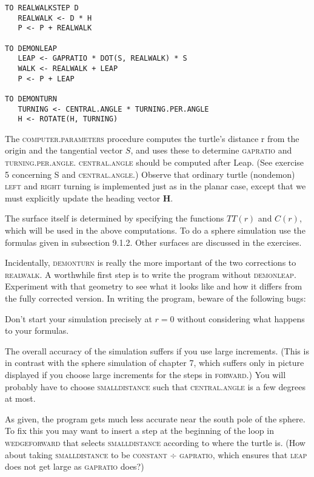 \documentclass{book}
\begin{document}
\begin{verbatim}
TO REALWALKSTEP D
   REALWALK <- D * H
   P <- P + REALWALK

TO DEMONLEAP
   LEAP <- GAPRATIO * DOT(S, REALWALK) * S
   WALK <- REALWALK + LEAP
   P <- P + LEAP

TO DEMONTURN
   TURNING <- CENTRAL.ANGLE * TURNING.PER.ANGLE
   H <- ROTATE(H, TURNING)
\end{verbatim}
The \textsc{computer}\textsc{.parameters} procedure computes the turtle's distance
r from the origin and the tangential vector $S$, and uses these to determine \textsc{gapratio} and \textsc{turning}\textsc{.per}\textsc{.angle}. \textsc{central}\textsc{.angle} should be
computed after Leap. (See exercise 5 concerning S and \textsc{central}\textsc{.angle}.)
Observe that ordinary turtle (nondemon) \textsc{left} and \textsc{right} turning is
implemented just as in the planar case, except that we must explicitly
update the heading vector \textbf{H}.

The surface itself is determined by specifying the functions $TT(r)$ and
$C(r)$, which will be used in the above computations. To do a sphere
simulation use the formulas given in subsection 9.1.2. Other surfaces
are discussed in the exercises.

Incidentally, \textsc{demonturn} is really the more important of the two corrections to \textsc{realwalk}. A worthwhile first step is to write the program
without \textsc{demonleap}. Experiment with that geometry to see what it looks
like and how it differs from the fully corrected version.
In writing the program, beware of the following bugs:

Don't start your simulation precisely at $r = 0$ without considering
what happens to your formulas.

The overall accuracy of the simulation suffers if you use large increments. (This is in contrast with the sphere simulation of chapter 7,
which suffers only in picture displayed if you choose large increments for
the steps in \textsc{forward}.) You will probably have to choose \textsc{smalldistance}
such that \textsc{central}\textsc{.angle} is a few degrees at most.

As given, the program gets much less accurate near the south pole of
the sphere. To fix this you may want to insert a step at the beginning
of the loop in \textsc{wedge}\textsc{forward} that selects \textsc{smalldistance} according to
where the turtle is. (How about taking \textsc{smalldistance} to be \textsc{constant} $\div$
\textsc{gapratio}, which ensures that \textsc{leap} does not get large as \textsc{gapratio} does?)
\end{document}

